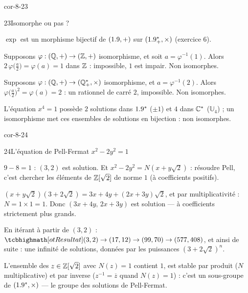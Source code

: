 \begin{blocLivre}{cor-8-23}
\begin{corrige}{23}{Isomorphe ou pas ?}
\begin{questions}
  \item $\exp$ est un morphisme bijectif de $(1.9,+)$ sur
    $(1.9_{+}^{*},\times)$ (exercice 6).
  \item Supposons $\varphi:(\mathbb{Q},+)\to(\mathbb{Z},+)$ isomorphisme, et soit
    $a=\varphi^{-1}(1)$. Alors
    $2\,\varphi\bigl(\frac a2\bigr)=\varphi(a)=1$ dans $\mathbb{Z}$ : impossible,
    $1$ est impair. Non isomorphes.
  \item Supposons $\varphi:(\mathbb{Q},+)\to(\mathbb{Q}_{+}^{*},\times)$ isomorphisme, et
    $a=\varphi^{-1}(2)$. Alors
    $\varphi\bigl(\frac a2\bigr)^{2}=\varphi(a)=2$ : un rationnel de carré
    $2$, impossible. Non isomorphes.
  \item L'équation $x^{4}=1$ possède $2$ solutions dans $1.9^{*}$
    ($\pm1$) et $4$ dans $\mathbb{C}^{*}$ ($\mathbb{U}_4$) ; un isomorphisme
    met ces ensembles de solutions en bijection : non isomorphes.
\end{questions}
\end{corrige}
\end{blocLivre}

\begin{blocLivre}{cor-8-24}
\begin{corrige}{24}{L'équation de Pell-Fermat $x^{2}-2y^{2}=1$}
\begin{questions}
  \item $9-8=1$ : $(3,2)$ est solution. Et $x^{2}-2y^{2}=N(x+y\sqrt2)$ :
    résoudre Pell, c'est chercher les éléments de $\mathbb{Z}[\sqrt2]$ de norme
    $1$ (à coefficients positifs).
  \item $(x+y\sqrt2)(3+2\sqrt2)=3x+4y+(2x+3y)\sqrt2$, et par
    multiplicativité : $N=1\times1=1$. Donc $(3x+4y,\,2x+3y)$ est
    solution — à coefficients strictement plus grands.
  \item En itérant à partir de $(3,2)$ :
    $\res{(3,2)\to(17,12)\to(99,70)\to(577,408)}$, et ainsi de suite :
    une infinité de solutions, données par les puissances
    $(3+2\sqrt2)^{n}$.
  \item L'ensemble des $z\in\mathbb{Z}[\sqrt2]$ avec $N(z)=1$ contient $1$, est
    stable par produit ($N$ multiplicative) et par inverse
    ($z^{-1}=\overline{z}$ quand $N(z)=1$) : c'est un sous-groupe de
    $(1.9^{*},\times)$ — le groupe des solutions de Pell-Fermat.
\end{questions}
\end{corrige}
\end{blocLivre}


